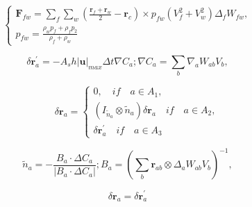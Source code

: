 \documentclass[UTF8]{ctexart}
\begin{document}
\begin{equation}
    \begin{cases} \mathbf{F}_{fw} = \sum_{f}\sum_{w}(\frac{\mathbf{r}_f+\mathbf{r}_w}{2}-\mathbf{r}_c)\times p_{fw}(V_f^2+V_w^2)\Delta_f W_{fw}, \\
    p_{fw}=\frac{\rho_w p_f+\rho_f p_2}{\rho_f+\rho_w} \end{cases} \qquad 
\end{equation}

\begin{equation}
\delta \mathbf{r}^{'}_a = -A_s h |\mathbf{u}|_{max} \Delta t \nabla C_a;\nabla C_a = \sum_{b}\nabla_a W_{ab} V_b , \qquad 
\end{equation}

\begin{equation}
    \delta \mathbf{r}_a = \begin{cases} 0, \quad if \quad a \in A_1,  \\
    (I_\tilde{n}_a\otimes\tilde{n}_a)\delta \mathbf{r}_a \quad if \quad a \in A_2,  \\
    \delta \mathbf{r}_a^{'} \quad if \quad a \in A_3 \end{cases} 
\end{equation}

\begin{equation}
    \tilde{n}_a = -\frac{B_a\cdot \Delta C_a }{|B_a \cdot \Delta C_a |};B_a = (\sum_{b}\mathbf{r}_{ab}\otimes\Delta_{a}W_{ab}V_b)^{-1}, \qquad 
\end{equation}

\begin{equation}
    \delta \mathbf{r}_a = \delta \mathbf{r}_a^{'}  \qquad 
\end{equation}
\end{document}

